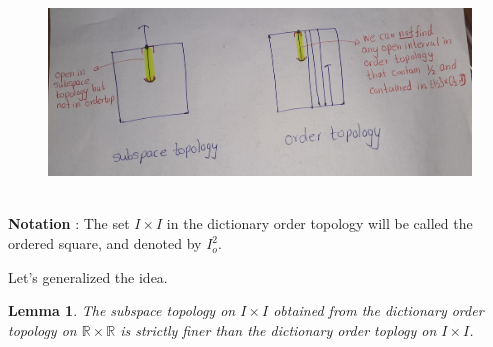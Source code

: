 \documentclass[
]{book}
\newtheorem{lemma}{Lemma}[chapter]
\theoremstyle{definition}
\theoremstyle{definition}
\theoremstyle{definition}
\theoremstyle{definition}
\theoremstyle{remark}
\begin{document}
\begin{figure}
\centering
\includegraphics{figures/figure 14.jpg}
\caption{\label{fig:fig14}\(~\)}
\end{figure}

\textbf{Notation} : The set \(I \times I\) in the dictionary order topology will be called the ordered square, and denoted by \(I_o^2\).

Let's generalized the idea.

\begin{lemma}
\protect\hypertarget{lem:unnamed-chunk-48}{}\label{lem:unnamed-chunk-48}The subspace topology on \(I \times I\) obtained from the dictionary order topology on \(\mathbb{R} \times \mathbb{R}\) is strictly finer than the dictionary order toplogy on \(I \times I\).
\end{lemma}
\end{document}
